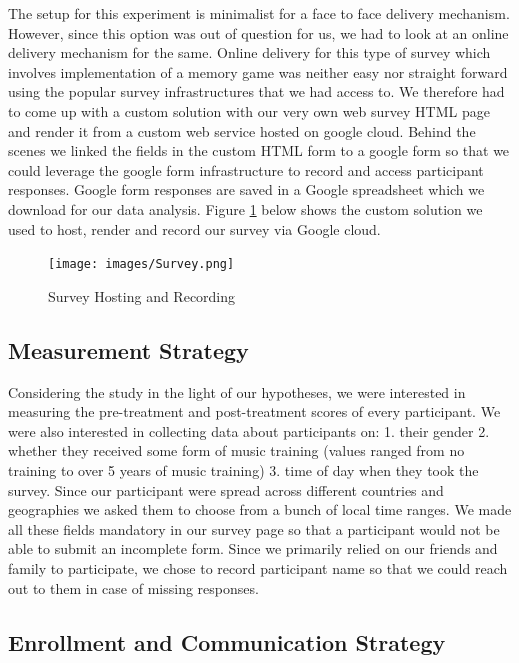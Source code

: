 \documentclass[journal,onecolumn, 12pt]{article}
\begin{document}
The setup for this experiment is minimalist for a face to face delivery mechanism. However, since this option was out of question for us, we had to look at an online delivery mechanism for the same. Online delivery for this type of survey which involves implementation of a memory game was neither easy nor straight forward using the popular survey infrastructures that we had access to. We therefore had to come up with a custom solution with our very own web survey HTML page and render it from a custom web service hosted on google cloud. Behind the scenes we linked the fields in the custom HTML form to a google form so that we could leverage the google form infrastructure to record and access participant responses. Google form responses are saved in a Google spreadsheet which we download for our data analysis. Figure \ref {fig: Survey} below shows the custom solution we used to host, render and record our survey via Google cloud.

\begin{figure}[h]
    \centering
    \texttt{[image: images/Survey.png]}
    \caption{Survey Hosting and Recording}
    \label{fig: Survey}
\end{figure}

\subsection{Measurement Strategy}

Considering the study in the light of our hypotheses, we were interested in measuring the pre-treatment and post-treatment scores of every participant. We were also interested in collecting data about participants on: 1. their gender 2. whether they received some form of music training (values ranged from no training to over 5 years of music training) 3. time of day when they took the survey. Since our participant were spread across different countries and geographies we asked them to choose from a bunch of local time ranges. We made all these fields mandatory in our survey page so that a participant would not be able to submit an incomplete form. Since we primarily relied on our friends and family to participate, we chose to record participant name so that we could reach out to them in case of missing responses. 

\subsection{Enrollment and Communication Strategy}
\end{document}
